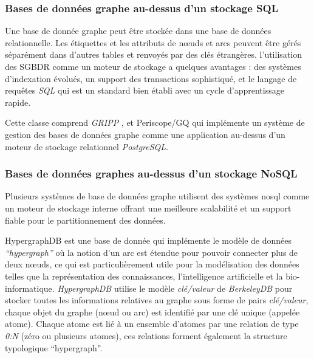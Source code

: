     \subsubsection{Bases de données graphe au-dessus d'un stockage
      SQL}
    \label{sec:graphdb-over-sql}
    Une base de donnée graphe peut être stockée dans une base de
    données relationnelle. Les étiquettes et les attributs de nœuds et
    arcs peuvent être gérés séparément dans d'autres tables et renvoyés
    par des clés étrangères. l'utilisation des \acrshort{SGBDR} comme
    un moteur de stockage a quelques avantages : des systèmes
    d'indexation évolués, un support des transactions sophistiqué, et
    le langage de requêtes \emph{SQL} qui est un standard bien établi
    avec un cycle d'apprentissage rapide.\medskip

    

    Cette classe comprend \emph{GRIPP} \cite{trissl2007fast}, et
    Periscope/GQ \cite{tian2008periscope} qui implémente un système de
    gestion des bases de données graphe comme une application
    au-dessus d'un moteur de stockage relationnel \emph{PostgreSQL}.

    \newpage
    \subsubsection{Bases de données graphes au-dessus d'un stockage
      NoSQL}
    \label{sec:graphdb-over-nosql}
    Plusieurs systèmes de base de données graphe utilisent des
    systèmes \acrshort{nosql} comme un moteur de stockage interne
    offrant une meilleure scalabilité et un support fiable pour le
    partitionnement des données.\bigskip

    \textsf{HypergraphDB} \cite{hypergraphdb,
      iordanov2010hypergraphdb} est une base de donnée qui implémente
    le modèle de données \emph{``hypergraph''} où la notion d'un arc
    est étendue pour pouvoir connecter plus de deux nœuds, ce qui est
    particulièrement utile pour la modélisation des données telles que
    la représentation des connaissances, l'intelligence artificielle
    et la bio-informatique. \emph{HypergraphDB} utilise le modèle
    \textit{clé/valeur} de \emph{BerkeleyDB} \cite{berkeleydb} pour
    stocker toutes les informations relatives au graphe sous forme de
    pairs \textit{clé/valeur}, chaque objet du graphe (nœud ou arc)
    est identifié par une clé unique (appelée atome). Chaque atome est
    lié à un ensemble d'atomes par une relation de type \emph{0:N}
    (zéro ou plusieurs atomes), ces relations forment également la
    structure typologique ``hypergraph''.\bigskip

